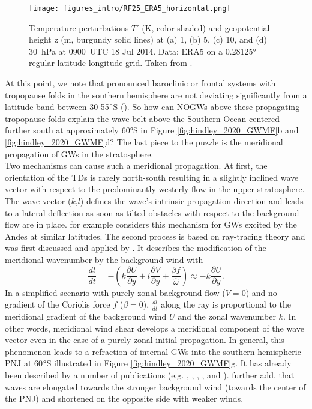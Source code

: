 \begin{figure}[t]
    \centering
    \texttt{[image: figures\_intro/RF25\_ERA5\_horizontal.png]}
    \caption{Temperature perturbations $T'$ (K, color shaded) and geopotential height z (m, burgundy solid lines) at (a) 1, (b) 5, (c) 10, and (d) \SI{30}{hPa} at \SI{0900}{UTC} 18 Jul 2014. Data: ERA5 on a 0.28125° regular latitude-longitude grid. Taken from \textcite[]{dornbrack_stratospheric_2022}.}
    \label{fig:RF25_era5_horizonal}
\end{figure} 
At this point, we note that pronounced baroclinic or frontal systems with tropopause folds in the southern hemisphere are not deviating significantly from a latitude band between 30-55$\degree$S (\cite{skerlak_tropopause_2015}). So how can NOGWs above these propagating tropopause folds explain the wave belt above the Southern Ocean centered further south at approximately 60°S in Figure \ref{fig:hindley_2020_GWMF}b and \ref{fig:hindley_2020_GWMF}d? The last piece to the puzzle is the meridional propagation of GWs in the stratosphere. \\
Two mechanisms can cause such a meridional propagation. At first, the orientation of the TDs is rarely north-south resulting in a slightly inclined wave vector with respect to the predominantly westerly flow in the upper stratosphere. The wave vector ($k$,$l$) defines the wave's intrinsic propagation direction and leads to a lateral deflection as soon as tilted obstacles with respect to the background flow are in place. \textcite{preusse_space-based_2002} for example considers this mechanism for GWs excited by the Andes at similar latitudes. The second process is based on ray-tracing theory and was first discussed and applied by \textcite{dunkerton_inertiagravity_1984}. It describes the modification of the meridional wavenumber by the background wind with
\begin{equation}
    \frac{dl}{dt} = -(k \frac{\partial U}{\partial y} + l \frac{\partial V}{\partial y} + \frac{\beta f}{\hat{\omega}})
    \approx -k \frac{\partial U}{\partial y}.
    \label{equ:meridionalRefraction}
\end{equation}
In a simplified scenario with purely zonal background flow ($V=0$) and no gradient of the Coriolis force $f$ ($\beta=0$), $\frac{dl}{dt}$ along the ray is proportional to the meridional gradient of the background wind $U$ and the zonal wavenumber $k$. In other words, meridional wind shear develops a meridional component of the wave vector even in the case of a purely zonal initial propagation. In general, this phenomenon leads to a refraction of internal GWs into the southern hemispheric PNJ at 60$\degree$S illustrated in Figure \ref{fig:hindley_2020_GWMF}g. It has already been described by a number of publications (e.g. \cite{dunkerton_inertiagravity_1984}, \cite{preusse_space-based_2002}, \cite{sato_origins_2009}, \cite*{sato_gravity_2012}, \cite{ehard_horizontal_2017} and \cite{jiang_stratospheric_2019}). \textcite{jiang_stratospheric_2019} further add, that waves are elongated towards the stronger background wind (towards the center of the PNJ) and shortened on the opposite side with weaker winds. \\
